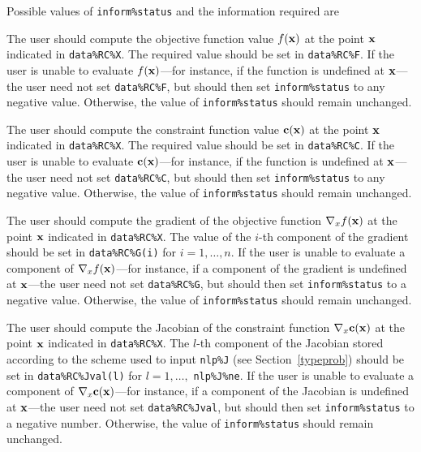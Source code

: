 \documentclass{galahad}
\begin{document}
Possible values of {\tt inform\%status} and the information required are
\begin{description}

 The user should compute the objective function
     value $f({\mathbf{x}})$ at the point ${\mathbf{x}}$ indicated in {\tt data\%RC\%X}.
     The required value should be set in {\tt data\%RC\%F}.  If the user is
     unable to evaluate $f({\mathbf{x}})$---for instance, if the function is
     undefined at ${\mathbf{x}}$---the user need not set {\tt data\%RC\%F}, but
     should then set {\tt inform\%status} to any negative value.
     Otherwise, the value of {\tt inform\%status} should remain unchanged.

 The user should compute the constraint function
     value ${\mathbf{c}}({\mathbf{x}})$ at the point ${\mathbf{x}}$ indicated in {\tt data\%RC\%X}.
     The required value should be set in {\tt data\%RC\%C}.  If the user is
     unable to evaluate ${\mathbf{c}}({\mathbf{x}})$---for instance, if the function is
     undefined at ${\mathbf{x}}$---the user need not set {\tt data\%RC\%C}, but
     should then set {\tt inform\%status} to any negative value.
     Otherwise, the value of {\tt inform\%status} should remain unchanged.

 The user should compute the gradient 
     of the objective function $\nabla_x f({\mathbf{x}})$ at the point ${\mathbf{x}}$ 
     indicated in {\tt data\%RC\%X}.
     The value of the $i$-th component of the gradient should be set 
     in {\tt data\%RC\%G(i)} for $i = 1, \ldots, n$.  If the user is
     unable to evaluate a component of $\nabla_x f({\mathbf{x}})$---for instance, 
     if a component of the gradient is
     undefined at ${\mathbf{x}}$---the user need not set {\tt data\%RC\%G}, but
     should then set {\tt inform\%status} to a negative
     value. Otherwise, the value of {\tt inform\%status} should remain
     unchanged.

 The user should compute the Jacobian  
     of the constraint function $\nabla_x {\mathbf{c}}({\mathbf{x}})$ at the point ${\mathbf{x}}$ 
     indicated in {\tt data\%RC\%X}. The $l$-th component of the Jacobian stored according to the
     scheme used to input {\tt nlp\%J} (see Section~\ref{typeprob})
     should be set in {\tt data\%RC\%Jval(l)} 
     for $l = 1, \ldots,$ {\tt  nlp\%J\%ne}.  If the user is
     unable to evaluate a component of $\nabla_x {\mathbf{c}}({\mathbf{x}})$---for instance, 
     if a component of the Jacobian is
     undefined at ${\mathbf{x}}$---the user need not set {\tt data\%RC\%Jval}, but
     should then set {\tt inform\%status} to a negative number.
     Otherwise, the value of {\tt inform\%status} should remain
     unchanged.


\end{description}
\end{document}
